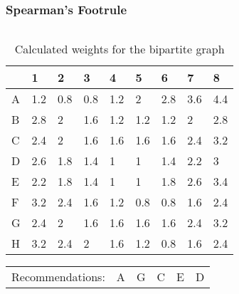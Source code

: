 \begin{frame}[t]
\frametitle{Spearman's Footrule}
\begin{columns}
\begin{column}{0.6\textwidth}
\begin{table}[h]
\captionsetup{font=footnotesize}
\footnotesize
\begin{tabular}{|l|llllllll|}\hline
  & 1   & 2   & 3   & 4   & 5   & 6   & 7   & 8   \\\hline
A & 1.2 & 0.8 & 0.8 & 1.2 & 2   & 2.8 & 3.6 & 4.4 \\
B & 2.8 & 2   & 1.6 & 1.2 & 1.2 & 1.2 & 2   & 2.8 \\
C & 2.4 & 2   & 1.6 & 1.6 & 1.6 & 1.6 & 2.4 & 3.2 \\
D & 2.6 & 1.8 & 1.4 & 1   & 1   & 1.4 & 2.2 & 3   \\
E & 2.2 & 1.8 & 1.4 & 1   & 1   & 1.8 & 2.6 & 3.4 \\
F & 3.2 & 2.4 & 1.6 & 1.2 & 0.8 & 0.8 & 1.6 & 2.4 \\
G & 2.4 & 2   & 1.6 & 1.6 & 1.6 & 1.6 & 2.4 & 3.2 \\
H & 3.2 & 2.4 & 2   & 1.6 & 1.2 & 0.8 & 1.6 & 2.4 \\\hline
\end{tabular}
\caption{Calculated weights for the bipartite graph}
\end{table}
\begin{table}
\begin{tabular}{llllll}
Recommendations: & A & G & C & E & D
\end{tabular}
\end{table}
\end{column}
\begin{column}{0.4\textwidth}
\vspace{-1.7cm}
\begin{figure}[h]
\end{figure}
\end{column}
\end{columns}
\end{frame}
